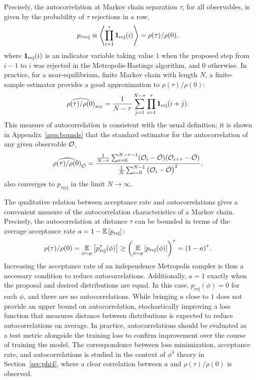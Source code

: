 Precisely, the autocorrelation at Markov chain separation $\tau$, for all observables, is given by the probability of $\tau$ rejections in a row,
%
\begin{equation}
p_{\tau\text{rej}} \equiv \avg{\prod_{i = 1}^\tau \mathbbm{1}_{\text{rej}}(i)} = \rho(\tau)/\rho(0),
\end{equation}
%
where $\mathbbm{1}_{\text{rej}}(i)$ is an indicator variable taking value $1$ when the proposed step from $i-1$ to $i$ was rejected in the Metropolis-Hastings algorithm, and $0$ otherwise. In practice, for a near-equilibrium, finite Markov chain with length $N$, a finite-sample estimator provides a good approximation to $\rho(\tau)/\rho(0)$:
%
\begin{equation}
\widehat{\rho(\tau)/\rho(0)}_{\text{acc}} = \frac{1}{N-\tau} \sum_{j=1}^{N-\tau} \prod_{i = 1}^\tau \mathbbm{1}_{\text{rej}}(i+j).
\end{equation}
%
This measure of autocorrelation is consistent with the usual definition; it is shown in Appendix~\ref{app:bounds} that the standard estimator for the autocorrelation of any given observable $\obs$,
%
\begin{equation}
\widehat{\rho(\tau)/\rho(0)}_\obs
=  \frac{\frac{1}{N-\tau} \sum_{i=0}^{N-\tau-1} (\obs_i - \bar{\obs})(\obs_{i+\tau}-\bar{\obs})}{\frac{1}{N} \sum_{i=0}^{N-1} \paren{\obs_i - \bar{\obs}}^2},
\end{equation}
%
also converges to $p_{\tau\text{rej}}$ in the limit $N\rightarrow \infty$.

The qualitative relation between acceptance rate and autocorrelations gives a convenient measure of the autocorrelation characteristics of a Markov chain. Precisely, the autocorrelation at distance $\tau$ can be bounded in terms of the average acceptance rate $a = 1 - \mathbb{E}\sq{p_\text{rej}}$:
\begin{equation}
\rho(\tau)/\rho(0) = \expt{\phi \sim p}\sq{p_{\text{rej}}^\tau(\phi)} \geq \paren{\expt{\phi \sim p}\sq{p_{\text{rej}}(\phi)}}^\tau = (1-a)^\tau.
\label{eq:mean-acc-bound}
\end{equation}
Increasing the acceptance rate of an independence Metropolis sampler is thus a necessary condition to reduce autocorrelations. Additionally, $a = 1$ exactly when the proposal and desired distributions are equal. In this case, $p_\text{rej}(\phi) = 0$ for each $\phi$, and there are no autocorrelations. While bringing $a$ close to $1$ does not provide an upper bound on autocorrelation, stochastically improving a loss function that measures distance between distributions is expected to reduce autocorrelations on average. In practice, autocorrelations should be evaluated as a test metric alongside the training loss to confirm improvement over the course of training the model. The correspondence between loss minimization, acceptance rate, and autocorrelations is studied in the context of $\phi^4$ theory in Section~\ref{sec:phi4}, where a clear correlation between $a$ and $\rho(\tau)/\rho(0)$ is observed.

